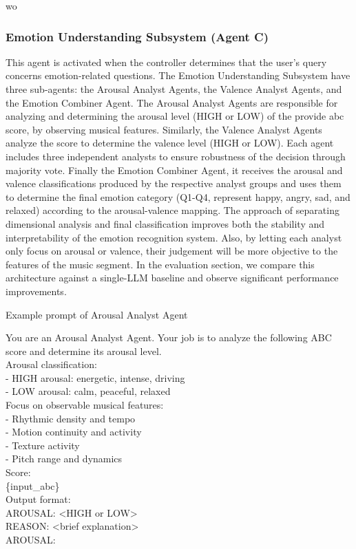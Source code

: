 wo\documentclass[sigconf]{acmart}
\begin{document}
\subsubsection{Emotion Understanding Subsystem (Agent C)}
This agent is activated when the controller determines that the user's query concerns emotion-related questions. The Emotion Understanding Subsystem have three sub-agents: the Arousal Analyst Agents, the Valence Analyst Agents, and the Emotion Combiner Agent. The Arousal Analyst Agents are responsible for analyzing and determining the arousal level (HIGH or LOW) of the provide abc score, by observing musical features. Similarly, the Valence Analyst Agents analyze the score to determine the valence level (HIGH or LOW). Each agent includes three independent analysts to ensure robustness of the decision through majority vote. Finally the Emotion Combiner Agent, it receives the arousal and valence classifications produced by the respective analyst groups and uses them to determine the final emotion category (Q1-Q4, represent happy, angry, sad, and relaxed) according to the arousal-valence mapping. The approach of separating dimensional analysis and final classification improves both the stability and interpretability of the emotion recognition system. Also, by letting each analyst only focus on arousal or valence, their judgement will be more objective to the features of the music segment. In the evaluation section, we compare this architecture against a single-LLM baseline and observe significant performance improvements.

\begin{promptbox}{Example prompt of Arousal Analyst Agent}

You are an Arousal Analyst Agent. Your job is to analyze the following ABC score and determine its arousal level.\\

Arousal classification:\\
- HIGH arousal: energetic, intense, driving\\
- LOW arousal: calm, peaceful, relaxed\\

Focus on observable musical features:\\
- Rhythmic density and tempo\\
- Motion continuity and activity\\
- Texture activity\\
- Pitch range and dynamics\\

Score:\\
\{input\_abc\}\\

Output format:\\
AROUSAL: <HIGH or LOW>\\
REASON: <brief explanation>\\

AROUSAL:
\end{promptbox}
\end{document}

